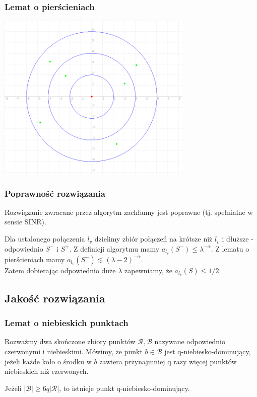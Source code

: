 \documentclass[polish, t,10pt]{beamer}
\begin{document}
\begin{frame}
    \frametitle{Lemat o pierścieniach}
    \centering
    \includegraphics[width=0.7\textwidth]{pictures/rings.png}
\end{frame}

\begin{frame}
    \frametitle{Poprawność rozwiązania}
    \begin{lemma}
        Rozwiązanie zwracane przez algorytm zachłanny jest poprawne (tj. spełnialne w sensie SINR).
    \end{lemma}
    Dla ustalonego połączenia $l_v$ dzielimy zbiór połączeń na krótsze niż $l_v$ i dłuższe - odpowiednio $S^{-}$ i $S^{+}$.
    Z definicji algorytmu mamy $a_{l_v}(S^{-}) \le \lambda^{-\alpha}$. Z lematu o pierścieniach mamy
    $a_{l_v}(S^{+}) \lesssim (\lambda - 2)^{-\alpha}$. \\
    Zatem dobierając odpowiednio duże $\lambda$ zapewniamy, że $a_{l_v}(S) \le 1/2$.
\end{frame}


\subsection{Jakość rozwiązania}
\begin{frame}
    \frametitle{Lemat o niebieskich punktach}
    \begin{definition}
        Rozważmy dwa skończone zbiory punktów $\mathcal{R}, \mathcal{B}$ nazywane odpowiednio czerwonymi i
        niebieskimi. Mówimy, że punkt $b \in \mathcal{B}$ jest q-niebiesko-dominujący, jeżeli każde koło
        o środku w $b$ zawiera przynajmniej q razy więcej punktów niebieskich niż czerwonych.
    \end{definition}
    \vfill
    \begin{lemma}
        Jeżeli $|\mathcal{B}| \ge 6q|\mathcal{R}|$, to istnieje punkt q-niebiesko-dominujący.
    \end{lemma}
\end{frame}
\end{document}

